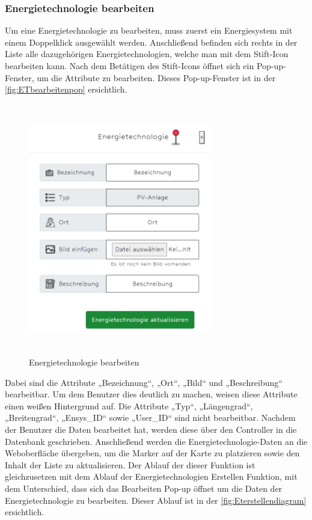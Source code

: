 \newpage
\subsubsection{Energietechnologie bearbeiten}
Um eine Energietechnologie zu bearbeiten, muss zuerst ein Energiesystem mit einem Doppelklick ausgewählt werden. Anschließend befinden sich rechts in der Liste alle dazugehörigen Energietechnologien, welche man mit dem Stift-Icon bearbeiten kann. Nach dem Betätigen des Stift-Icons öffnet sich ein Pop-up-Fenster, um die Attribute zu bearbeiten. Dieses Pop-up-Fenster ist in der \autoref{fig:ETbearbeitenpop} ersichtlich.
\newline
\begin{figure}[h]
	\centering
	\includegraphics[height=11cm,width=8cm]{images/ETbearbeitenPop}
	\caption{Energietechnologie bearbeiten}
	\label{fig:ETbearbeitenpop}
\end{figure}


Dabei sind die Attribute „Bezeichnung“, „Ort“, „Bild“ und „Beschreibung“ bearbeitbar. Um dem Benutzer dies deutlich zu machen, weisen diese Attribute einen weißen Hintergrund auf. 
Die Attribute „Typ“, „Längengrad“, „Breitengrad“, „Ensys\_ID“ sowie „User\_ID“ sind nicht bearbeitbar.
Nachdem der Benutzer die Daten bearbeitet hat, werden diese über den Controller in die Datenbank geschrieben. Anschließend werden die Energietechnologie-Daten an die Weboberfläche übergeben, um die Marker auf der Karte zu platzieren sowie den Inhalt der Liste zu aktualisieren. Der Ablauf der dieser Funktion ist gleichzusetzen mit dem Ablauf der Energietechnologien Erstellen Funktion, mit dem Unterschied, dass sich das Bearbeiten Pop-up öffnet um die Daten der Energietechnologie zu bearbeiten. Dieser Ablauf ist in der \autoref{fig:Eterstellendiagram} ersichtlich. 



